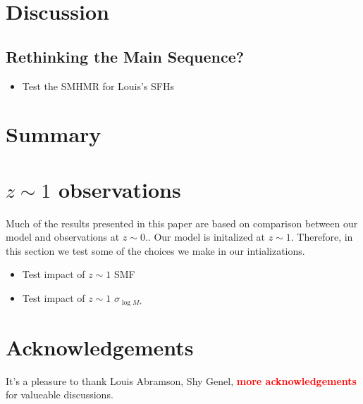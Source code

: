 \documentclass[12pt, letterpaper, preprint]{aastex}
\newcommand{\todo}[1]{{\bf \textcolor{red}{#1}}}
\newcommand{\bitem}{\begin{itemize}}
\newcommand{\eitem}{\end{itemize}}
\begin{document}
\section{Discussion} \label{sec:discussion}
\subsection{Rethinking the Main Sequence?}
\bitem 
\item Test the SMHMR for Louis's SFHs 
\eitem 

\section{Summary} \label{sec:summary}


\appendix
\section{$z \sim 1$ observations} \label{app:z1}
Much of the results presented in this paper are based on comparison 
between our model and observations at $z \sim 0.$. Our model is initalized 
at $z \sim 1$. Therefore, in this section we test some of the choices 
we make in our intializations. 

\bitem
\item Test impact of $z \sim 1$ SMF
\item Test impact of $z \sim 1$ $\sigma_{\log M_*}$ 
\eitem

\section*{Acknowledgements}
It's a pleasure to thank 
    Louis Abramson, 
    Shy Genel, 
    \todo{more acknowledgements} 
for valueable discussions. 



\end{document}
